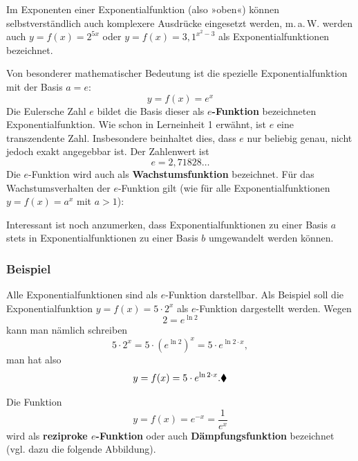 Im Exponenten einer Exponentialfunktion (also »oben«) können selbstverständlich auch komplexere Ausdrücke eingesetzt werden, m.\,a.\,W. werden auch $y = f(x) = 2^{5x}$ oder $y = f(x) = 3{,}1^{x^2 - 3}$ als Exponentialfunktionen bezeichnet.

Von besonderer mathematischer Bedeutung ist die spezielle Exponentialfunktion mit der Basis $a = e$:
\[ y = f(x) = e^x \]
Die Eulersche Zahl $e$ bildet die Basis dieser als \textbf{$e$-Funktion} bezeichneten Exponentialfunktion. Wie schon in Lerneinheit 1 erwähnt, ist $e$ eine transzendente Zahl. Insbesondere beinhaltet dies, dass $e$ nur beliebig genau, nicht jedoch exakt angegebbar ist. Der Zahlenwert ist
\[ e = 2{,}71828\ldots \]
Die $e$-Funktion wird auch als \textbf{Wachstumsfunktion} bezeichnet. Für das Wachstumsverhalten der $e$-Funktion gilt (wie für alle Exponentialfunktionen $y = f(x) = a^x$ mit $a > 1$):

Interessant ist noch anzumerken, dass Exponentialfunktionen zu einer Basis $a$ stets in Exponentialfunktionen zu einer Basis $b$ umgewandelt werden können.

\subsubsection{Beispiel}

Alle Exponentialfunktionen sind als $e$-Funktion darstellbar. Als Beispiel soll die Exponentialfunktion $y = f(x) = 5 \cdot 2^x$ als $e$-Funktion dargestellt werden. Wegen
\[ 2 = e^{\ln 2} \]
kann man nämlich schreiben
\[ 5 \cdot 2^x = 5 \cdot \left(e^{\ln 2}\right)^x = 5 \cdot e^{\ln 2 \cdot x} , \]
man hat also
\[ y = f(x) = 5 \cdot e^{\ln 2 \cdot x} .\beispielende \]

Die Funktion
\[ y = f(x) = e^{-x} = \frac{1}{e^x} \]
wird als \textbf{reziproke $e$-Funktion} oder auch \textbf{Dämpfungsfunktion} bezeichnet (vgl. dazu die folgende Abbildung).

\begin{center}
\end{center}

